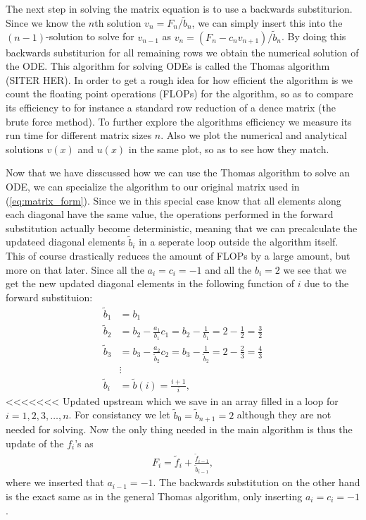 \documentclass[twocolumn]{aastex62}
\begin{document}
The next step in solving the matrix equation is to use a backwards substiturion. Since we know the $n$th solution $v_n = F_n/\tilde{b}_n$, we can simply insert this into the $(n-1)$-solution to solve for $v_{n-1}$ as $v_{n} = (F_{n} - c_{n}v_{n+1})/ \tilde{b}_{n}$. By doing this backwards substiturion for all remaining rows we obtain the numerical solution of the ODE. This algorithm for solving ODEs is called the Thomas algorithm (SITER HER). In order to get a rough idea for how efficient the algorithm is we count the floating point operations (FLOPs) for the algorithm, so as to compare its efficiency to for instance a standard row reduction of a dence matrix (the brute force method). To further explore the algorithms efficiency we measure its run time for different matrix sizes $n$. Also we plot the numerical and analytical solutions $v(x)$ and $u(x)$ in the same plot, so as to see how they match. 

Now that we have disscussed how we can use the Thomas algorithm to solve an ODE, we can specialize the algorithm to our original matrix used in (\ref{eq:matrix_form}). Since we in this special case know that all elements along each diagonal have the same value, the operations performed in the forward substitution actually become deterministic, meaning that we can precalculate the updateed diagonal elements $\tilde{b}_i$ in a seperate loop outside the algorithm itself. This of course drastically reduces the amount of FLOPs by a large amount, but more on that later. Since all the $a_i = c_i = -1$ and all the $b_i = 2$ we see that we get the new updated diagonal elements in the following function of $i$ due to the forward substituion:
\begin{align}
	\tilde{b}_1 &= b_1\\
	\tilde{b}_2 &= b_2 - \frac{a_1}{b_1}c_1 = b_2 - \frac{1}{b_1} = 2 - \frac{1}{2} = \frac{3}{2}\\
	\tilde{b}_3 &= b_3 - \frac{a_2}{\tilde{b}_2}c_2 = b_3 - \frac{1}{\tilde{b}_2} = 2 - \frac{2}{3} = \frac{4}{3}\\
	&\vdots\\
	\tilde{b}_i &= \tilde{b}(i) = \frac{i + 1}{i},
\end{align} 
<<<<<<< Updated upstream
which we save in an array filled in a loop for $i = 1, 2, 3,\ldots, n$. For consistancy we let $\tilde{b}_0 = \tilde{b}_{n+1} = 2$ although they are not needed for solving. Now the only thing needed in the main algorithm is thus the update of the $f_i$'s as 
\begin{align}
	F_i = \tilde{f}_i + \frac{\tilde{f}_{i-1}}{\tilde{b}_{i-1}},
\end{align}
where we inserted that $a_{i-1} = -1$.
The backwards substitution on the other hand is the exact same as in the general Thomas algorithm, only inserting $a_i = c_i = -1$.
\end{document}
